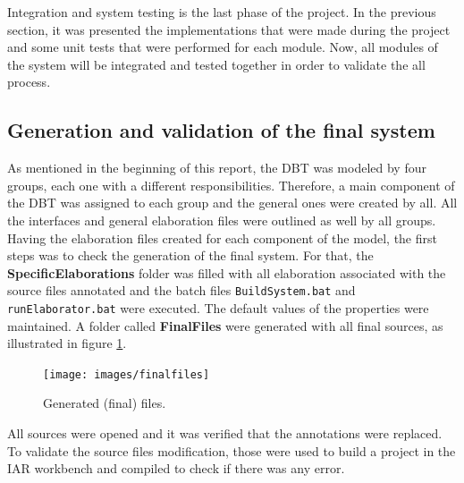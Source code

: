 
Integration and system testing is the last phase of the project. In the previous section, it was presented the implementations that were made during the project and some unit tests that were performed for each module. Now, all modules of the system will be integrated and tested together in order to validate the all process.

\subsection{Generation and validation of the final system}

As mentioned in the beginning of this report, the DBT was modeled by four groups, each one with a different responsibilities. Therefore, a main component of the DBT was assigned to each group and the general ones were created by all. All the interfaces and general elaboration files were outlined as well by all groups. \\

Having the elaboration files created for each component of the model, the first steps was to check the generation of the final system. For that, the \textbf{SpecificElaborations} folder was filled with all elaboration associated with the source files annotated and the batch files \texttt{BuildSystem.bat} and \texttt{runElaborator.bat} were executed. The default values of the properties were maintained. A folder called \textbf{FinalFiles} were generated with all final sources, as illustrated in figure \ref{fig:final_files}.


\begin{figure}[H]
\centerline{
\texttt{[image: images/finalfiles]}
}
\caption{Generated (final) files.}
\label{fig:final_files}
\end{figure}

All sources were opened and it was verified that the annotations were replaced. To validate the source files modification, those were used to build a project in the IAR workbench and compiled to check if there was any error.

